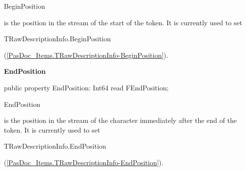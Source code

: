 \documentclass{report}
\newif\ifpdf
\begin{document}
\begin{list}{}
\par \begin{ttfamily}BeginPosition\end{ttfamily} is the position in the stream of the start of the token. It is currently used to set \begin{ttfamily}TRawDescriptionInfo.BeginPosition\end{ttfamily}(\ref{PasDoc_Items.TRawDescriptionInfo-BeginPosition}).\label{PasDoc_Tokenizer.TToken-EndPosition}
\item[\textbf{EndPosition}\hfill]
\ifpdf
\begin{flushleft}
\fi
\begin{ttfamily}
public property EndPosition: Int64 read FEndPosition;\end{ttfamily}

\ifpdf
\end{flushleft}
\fi


\par \begin{ttfamily}EndPosition\end{ttfamily} is the position in the stream of the character immediately after the end of the token. It is currently used to set \begin{ttfamily}TRawDescriptionInfo.EndPosition\end{ttfamily}(\ref{PasDoc_Items.TRawDescriptionInfo-EndPosition}).\end{list}
\end{document}
